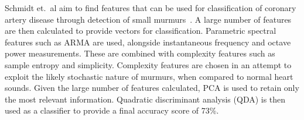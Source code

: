 \documentclass[titlepage, 12pt]{scrartcl} \usepackage{enumitem}
\begin{document}
Schmidt et.\ al aim to find features that can be used for classification of
coronary artery disease through detection of small
murmurs~\citeyearpar{Schmidt2015}. A large number of features are then
calculated to provide vectors for classification. Parametric spectral features
such as ARMA are used, alongside instantaneous frequency and octave power
measurements. These are combined with complexity features such as sample
entropy and simplicity. Complexity features are chosen in an attempt to exploit
the likely stochastic nature of murmurs, when compared to normal heart sounds.
Given the large number of features calculated, PCA is used to retain only the
most relevant information. Quadratic discriminant analysis (QDA) is then used
as a classifier to provide a final accuracy score of 73\%.\\
\end{document}
